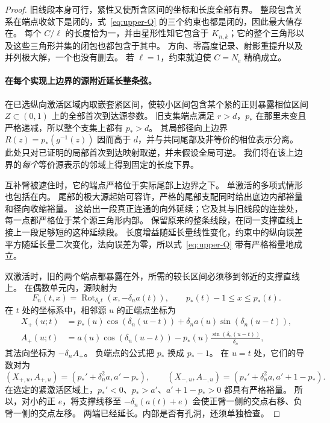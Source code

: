 \begin{proof}
旧线段本身可行，紧性又使所含区间的坐标和长度全部有界。
整段包含关系在端点收敛下是闭的，式~\eqref{eq:upper-Q} 的三个约束也都是闭的，因此最大值存在。
每个 $C/\ell$ 的长度恰为一，并由星形性知它包含于 $K_{n,k}$；它的整个三角形以及这些三角形并集的闭包也都包含于其中。
方向、零高度记录、射影重提升以及并列极大解，一个也没有删去。
若 $\ell=1$，约束就迫使 $C=N_e$ 精确成立。

\paragraph{在每个实现上边界的源附近延长整条弦。}
在已选纵向激活区域内取嵌套紧区间，使较小区间包含某个紧的正则暴露相位区间 $Z\subset(0,1)$ 上的全部首次到达源参数。
旧支集端点满足 $r>d$，$p_*$ 在那里未变且严格递减，所以整个支集上都有 $p_*>d$。
其局部径向上边界 $R(z)=p_*(g^{-1}(z))$ 因而高于 $d$，并与共同尾部及非等价的相位表示分离。
此处只对已证明的局部首次到达映射取逆，并未假设全局可逆。
我们将在该上边界的\emph{每个}等价源表示的邻域上得到固定的长度下界。

互补臂被遮住时，它的端点严格位于实际尾部上边界之下。
单激活的多项式情形也包括在内。
尾部的极大源起始可容许，严格的尾部支配同时给出底边内部裕量和径向收缩裕量。
这给出一段真正连通的向外延续；它及其与旧线段的连接处，每一点都严格位于某个源三角形内部。
保留原来的整条线段，在同一支撑直线上接上一段足够短的这种延续段。
长度增益随延长量线性变化，约束中的纵向误差平方随延长量二次变化，法向误差为零，所以式~\eqref{eq:upper-Q} 带有严格裕量地成立。

双激活时，旧的两个端点都暴露在外，所需的较长区间必须移到邻近的支撑直线上。
在偶数单元内，源映射为
\[
 F_n(t,x)=\operatorname{Rot}_{\delta_n t}(x,-\delta_n a(t)),
                         \qquad p_*(t)-1\le x\le p_*(t).
\]
在 $t$ 处的坐标系中，相邻源 $u$ 的正端点坐标为
\begin{align}
 X_+(u;t)&=p_*(u)\cos(\delta_n(u-t))
                    +\delta_n a(u)\sin(\delta_n(u-t)),\\
 A_+(u;t)&=a(u)\cos(\delta_n(u-t))
                    -p_*(u)\frac{\sin(\delta_n(u-t))}{\delta_n},
\end{align}
其法向坐标为 $-\delta_n A_+$。
负端点的公式把 $p_*$ 换成 $p_*-1$。
在 $u=t$ 处，它们的导数对为
\[
 (X_{+,u},A_{+,u})=(p_*'+\delta_n^2a,a'-p_*),\qquad
 (X_{-,u},A_{-,u})=(p_*'+\delta_n^2a,a'+1-p_*).
\]
在选定的紧激活区域上，$p_*'<0$、$p_*>a'$、$a'+1-p_*>0$ 都具有严格裕量。
所以，对小的正 $e$，将支撑线移至 $-\delta_n(a(t)+e)$ 会使正臂一侧的交点右移、负臂一侧的交点左移。
两端已经延长。内部是否有孔洞，还须单独检查。


\end{proof}
